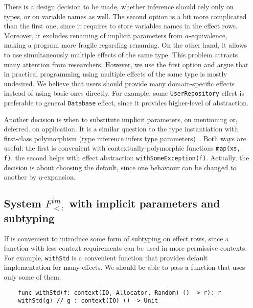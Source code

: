 \documentclass[acmsmall]{acmart}
\begin{document}
There is a design decision to be made, whether inference should rely only on types, or on variable names as well.
The second option is a bit more complicated than the first one, since it requires to store variables names in the effect rows.
Moreover, it excludes renaming of implicit parameters from $\alpha$-equivalence, making a program more fragile regarding renaming.
On the other hand, it allows to use simultaneously multiple effects of the same type.
This problem attracts many attention from researchers. %
However, we use the first option and argue that in practical programming using multiple effects of the same type is mostly undesired.
We believe that users should provide many domain-specific effects instead of using basic ones directly.
For example, some \texttt{UserRepository} effect is preferable to general \texttt{Database} effect, since it provides higher-level of abstraction.

Another decision is when to substitute implicit parameters, on mentioning or, deferred, on application.
It is a similar question to the type instantiation with first-class polymorphism (type inference infers type parameters)~\cite{emrich2020freezeml}. %
Both ways are useful: the first is convenient with contextually-polymorphic functions \texttt{map(xs, f)}, the second helps with effect abstraction \texttt{withSomeException(f)}. %
Actually, the decision is about choosing the default, since one behaviour can be changed to another by $\eta$-expansion. %

\subsection{System $F^{im}_{<:}$ with implicit parameters and subtyping} \label{subsec:im-sub}

If is convenient to introduce some form of subtyping on effect rows, since a function with less context requirements can be used in more permissive contexts.
For example, \texttt{withStd} is a convenient function that provides default implementation for many effects.
We should be able to pass a function that uses only some of them:
\begin{verbatim}
    func withStd(f: context(IO, Allocator, Random) () -> r): r
    withStd(g) // g : context(IO) () -> Unit
\end{verbatim}
\end{document}
